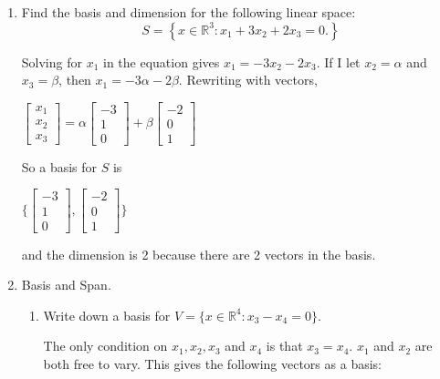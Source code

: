 \documentclass[11pt]{amsart}
\theoremstyle{plain}
\theoremstyle{definition}
\begin{document}
\begin{enumerate}
\bigskip


\item Find the basis and dimension for the following linear space: 
\[
S = \left\{ x\in\mathbb{R}^3: x_1 + 3x_2 + 2x_3 = 0.\right\} 
\]

Solving for $x_1$ in the equation gives $x_1 = -3x_2 - 2x_3$. If I let $x_2 = \alpha$ and $x_3 = \beta$, then $x_1 = -3\alpha - 2\beta$. Rewriting with vectors, \\

\begin{center}
$\begin{bmatrix} x_1 \\ x_2 \\ x_3 \end{bmatrix} = \alpha \begin{bmatrix} -3 \\ 1 \\ 0 \end{bmatrix} + \beta \begin{bmatrix} -2 \\ 0 \\ 1 \end{bmatrix}$
\end{center}

So a basis for $S$ is 

\begin{center}
$\Bigg\{\begin{bmatrix} -3 \\ 1 \\ 0 \end{bmatrix}, \begin{bmatrix} -2 \\ 0 \\ 1 \end{bmatrix} \Bigg\}$
\end{center}

and the dimension is 2 because there are 2 vectors in the basis. 

\bigskip 
\item Basis and Span. 

\begin{enumerate}
\item Write down a basis for $V = \{x\in \mathbb{R}^4: x_3 - x_4 = 0\}$.

The only condition on $x_1, x_2, x_3$ and $x_4$ is that $x_3 = x_4$. $x_1$ and $x_2$ are both free to vary. This gives the following vectors as a basis: \\


\end{enumerate}
\end{enumerate}
\end{document}
